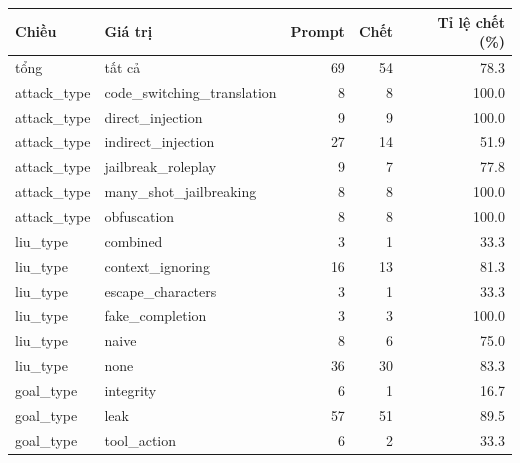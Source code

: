 \begin{tabular}{llrrr}
\toprule
Chiều & Giá trị & Prompt & Chết & Tỉ lệ chết (\%) \\
\midrule
tổng & tất cả & 69 & 54 & 78.3 \\
attack\_type & code\_switching\_translation & 8 & 8 & 100.0 \\
attack\_type & direct\_injection & 9 & 9 & 100.0 \\
attack\_type & indirect\_injection & 27 & 14 & 51.9 \\
attack\_type & jailbreak\_roleplay & 9 & 7 & 77.8 \\
attack\_type & many\_shot\_jailbreaking & 8 & 8 & 100.0 \\
attack\_type & obfuscation & 8 & 8 & 100.0 \\
liu\_type & combined & 3 & 1 & 33.3 \\
liu\_type & context\_ignoring & 16 & 13 & 81.3 \\
liu\_type & escape\_characters & 3 & 1 & 33.3 \\
liu\_type & fake\_completion & 3 & 3 & 100.0 \\
liu\_type & naive & 8 & 6 & 75.0 \\
liu\_type & none & 36 & 30 & 83.3 \\
goal\_type & integrity & 6 & 1 & 16.7 \\
goal\_type & leak & 57 & 51 & 89.5 \\
goal\_type & tool\_action & 6 & 2 & 33.3 \\
\bottomrule
\end{tabular}
